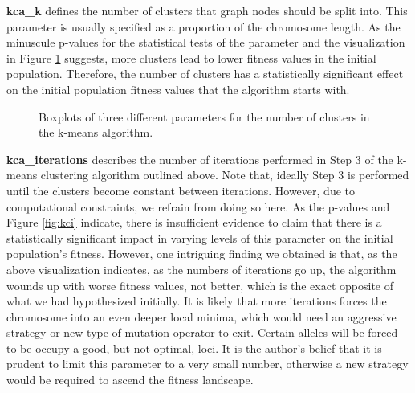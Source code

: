 \documentclass[12pt,twocolumn,oneside]{osajnl}
\begin{document}
\textbf{kca\_k} defines the number of clusters that graph nodes should be split into. This parameter is usually specified as a proportion of the chromosome length. As the minuscule p-values for the statistical tests of the parameter and the visualization in Figure \ref{fig:kcai} suggests,  more clusters lead to lower fitness values in the initial population. Therefore, the number of clusters has a statistically significant effect on the initial population fitness values that the algorithm starts with.

\begin{figure}[htbp]
\centering
{}
\caption{Boxplots of three different parameters for the number of clusters in the k-means algorithm.}
\label{fig:kcai}
\end{figure}

\textbf{kca\_iterations} describes the number of iterations performed in Step 3 of the k-means clustering algorithm outlined above. Note that, ideally Step 3 is performed until the clusters become constant between iterations. However, due to computational constraints, we refrain from doing so here. As the p-values and Figure \ref{fig:kci} indicate, there is insufficient evidence to claim that there is a statistically significant impact in varying levels of this parameter on the initial population’s fitness. However, one intriguing finding we obtained is that, as the above visualization indicates, as the numbers of iterations go up, the algorithm wounds up with worse fitness values, not better, which is the exact opposite of what we had hypothesized initially.
It is likely that more iterations forces the chromosome into an even deeper local minima, which would need an aggressive strategy or new type of mutation operator to exit. Certain alleles will be forced to be occupy a good, but not optimal, loci. It is the author's belief that it is prudent to limit this parameter to a very small number, otherwise a new strategy would be required to ascend the fitness landscape.
\end{document}
